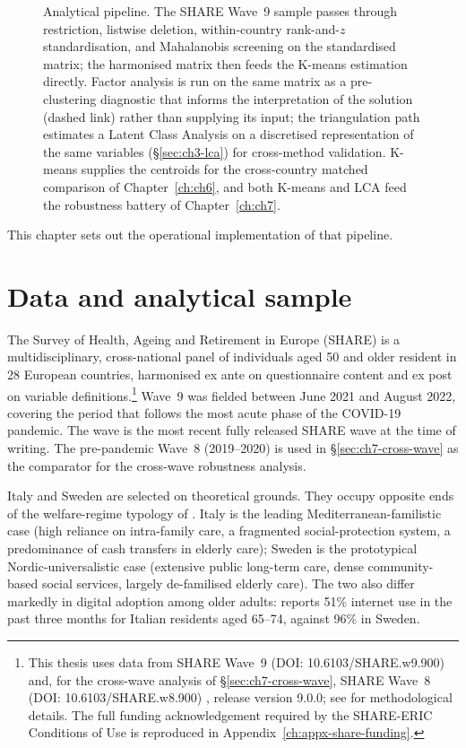 \begin{figure}[!t]
  \caption[Analytical pipeline]{Analytical pipeline. The SHARE Wave~9 sample passes through restriction, listwise deletion, within-country rank-and-$z$ standardisation, and Mahalanobis screening on the standardised matrix; the harmonised matrix then feeds the K-means estimation directly. Factor analysis is run on the same matrix as a pre-clustering diagnostic that informs the interpretation of the solution (dashed link) rather than supplying its input; the triangulation path estimates a Latent Class Analysis on a discretised representation of the same variables (\S\ref{sec:ch3-lca}) for cross-method validation. K-means supplies the centroids for the cross-country matched comparison of Chapter~\ref{ch:ch6}, and both K-means and LCA feed the robustness battery of Chapter~\ref{ch:ch7}.}
  \label{fig:ch3-pipeline}
\end{figure}

This chapter sets out the operational implementation of that pipeline.

\section{Data and analytical sample}
\label{sec:ch3-data}

The Survey of Health, Ageing and Retirement in Europe (SHARE) is a multidisciplinary, cross-national panel of individuals aged 50 and older resident in 28 European countries, harmonised ex ante on questionnaire content and ex post on variable definitions.\footnote{This thesis uses data from SHARE Wave~9 (DOI: 10.6103/SHARE.w9.900) \citep{share_w9_2024} and, for the cross-wave analysis of \S\ref{sec:ch7-cross-wave}, SHARE Wave~8 (DOI: 10.6103/SHARE.w8.900) \citep{share_w8_2024}, release version 9.0.0; see \citet{borschsupan2013} for methodological details. The full funding acknowledgement required by the SHARE-ERIC Conditions of Use is reproduced in Appendix~\ref{ch:appx-share-funding}.} Wave~9 was fielded between June 2021 and August 2022, covering the period that follows the most acute phase of the COVID-19 pandemic. The wave is the most recent fully released SHARE wave at the time of writing. The pre-pandemic Wave~8 (2019--2020) is used in \S\ref{sec:ch7-cross-wave} as the comparator for the cross-wave robustness analysis.

Italy and Sweden are selected on theoretical grounds. They occupy opposite ends of the welfare-regime typology of \citet{espingandersen1990}. Italy is the leading Mediterranean-familistic case (high reliance on intra-family care, a fragmented social-protection system, a predominance of cash transfers in elderly care); Sweden is the prototypical Nordic-universalistic case (extensive public long-term care, dense community-based social services, largely de-familised elderly care). The two also differ markedly in digital adoption among older adults: \citet{eurostat2022} reports 51\% internet use in the past three months for Italian residents aged 65--74, against 96\% in Sweden.

